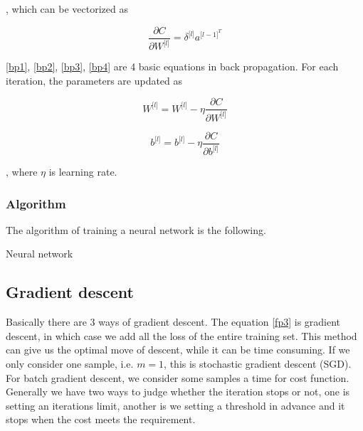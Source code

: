 \documentclass[11pt]{scrartcl} %
\begin{document}
, which can be vectorized as 

\begin{equation}
\frac{\partial C}{\partial W^{\lbrack l\rbrack}}=\delta^{\lbrack l\rbrack}a^{{\lbrack l-1\rbrack}^T}
\label{bp4}
\end{equation}

\eqref{bp1}, \eqref{bp2}, \eqref{bp3}, \eqref{bp4} are 4 basic equations in back propagation. For each iteration, the parameters are updated as 

\begin{equation}
W^{\lbrack l\rbrack}=W^{\lbrack l\rbrack}-\eta \frac{\partial C}{\partial W^{\lbrack l\rbrack}}
\label{bp5}
\end{equation}

\begin{equation}
b^{\lbrack l\rbrack}=b^{\lbrack l\rbrack}-\eta \frac{\partial C}{\partial b^{\lbrack l\rbrack}}
\label{bp6}
\end{equation}

, where $\eta$ is learning rate.

\subsubsection{Algorithm}
The algorithm of training a neural network is the following.
\begin{algorithm}
	\caption{Neural network}
	\label{alg:A}
	\begin{algorithmic}
	\end{algorithmic}
\end{algorithm}

\subsection{Gradient descent}

Basically there are 3 ways of gradient descent. The equation \eqref{fp3} is gradient descent, in which case we add all the loss of the entire training set. This method can give us the optimal move of descent, while it can be time consuming. If we only consider one sample, i.e. $m=1$, this is stochastic gradient descent (SGD). For batch gradient descent, we consider some samples a time for cost function. Generally we have two ways to judge whether the iteration stops or not, one is setting an iterations limit, another is we setting a threshold in advance and it stops when the cost meets the requirement.
\end{document}

